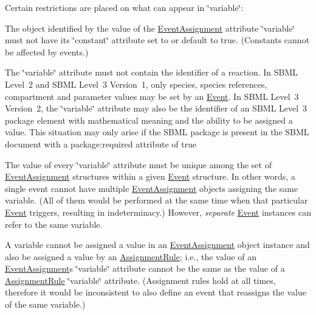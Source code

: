 Certain restrictions are placed on what can appear in \char`\"{}variable\char`\"{}\+: 
\begin{DoxyItemize}
\item The object identified by the value of the \hyperlink{class_event_assignment}{Event\+Assignment} attribute \char`\"{}variable\char`\"{} must not have its \char`\"{}constant\char`\"{} attribute set to or default to {\ttfamily true}. (Constants cannot be affected by events.)


\item The \char`\"{}variable\char`\"{} attribute must not contain the identifier of a reaction. In S\+B\+ML Level~2 and S\+B\+ML Level~3 Version~1, only species, species references, compartment and parameter values may be set by an \hyperlink{class_event}{Event}. In S\+B\+ML Level~3 Version~2, the \char`\"{}variable\char`\"{} attribute may also be the identifier of an S\+B\+ML Level~3 package element with mathematical meaning and the ability to be assigned a value. This situation may only arise if the S\+B\+ML package is present in the S\+B\+ML document with a package\+:required attribute of {\ttfamily true} 


\item The value of every \char`\"{}variable\char`\"{} attribute must be unique among the set of \hyperlink{class_event_assignment}{Event\+Assignment} structures within a given \hyperlink{class_event}{Event} structure. In other words, a single event cannot have multiple \hyperlink{class_event_assignment}{Event\+Assignment} objects assigning the same variable. (All of them would be performed at the same time when that particular \hyperlink{class_event}{Event} triggers, resulting in indeterminacy.) However, {\itshape separate} \hyperlink{class_event}{Event} instances can refer to the same variable.


\item A variable cannot be assigned a value in an \hyperlink{class_event_assignment}{Event\+Assignment} object instance and also be assigned a value by an \hyperlink{class_assignment_rule}{Assignment\+Rule}; i.\+e., the value of an \hyperlink{class_event_assignment}{Event\+Assignment}\textquotesingle{}s \char`\"{}variable\char`\"{} attribute cannot be the same as the value of a \hyperlink{class_assignment_rule}{Assignment\+Rule}\textquotesingle{} \char`\"{}variable\char`\"{} attribute. (Assignment rules hold at all times, therefore it would be inconsistent to also define an event that reassigns the value of the same variable.) 
\end{DoxyItemize}

